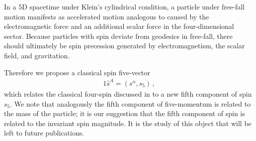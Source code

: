 In a 5D spacetime under Klein's cylindrical condition, a particle under free-fall motion manifests as accelerated motion analogous to  caused by the electromagnetic force and an additional scalar force in the four-dimensional sector. Because particles with spin deviate from geodesics in free-fall, there should ultimately be spin precession generated by electromagnetism, the scalar field, and gravitation.

Therefore we propose a classical spin five-vector
\begin{alignat}{1}
	\label{KALUZA01a} \hat{s}^{A}=(s^{\alpha},s_{5})\,,
\end{alignat}
which relates the classical four-spin  discussed in  to a new fifth component of spin $s_{5}$. We note that analogously the fifth component of five-momentum is related to the mass of the particle; it is our suggestion that the fifth component of spin is related to the invariant spin magnitude. It is the study of this object that will be left to future publications.